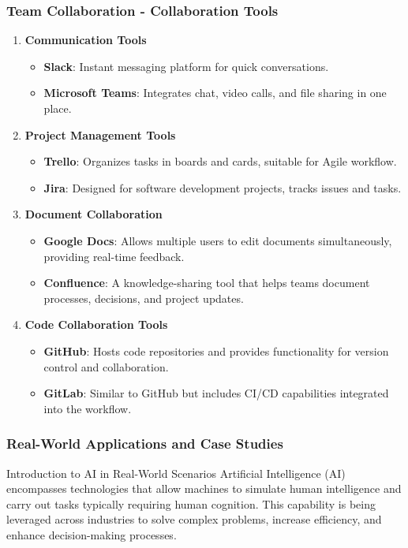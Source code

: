 \documentclass{beamer}
\begin{document}
\begin{frame}[fragile]
    \frametitle{Team Collaboration - Collaboration Tools}
    \begin{enumerate}
        \item \textbf{Communication Tools}
        \begin{itemize}
            \item \textbf{Slack}: Instant messaging platform for quick conversations.
            \item \textbf{Microsoft Teams}: Integrates chat, video calls, and file sharing in one place.
        \end{itemize}
        
        \item \textbf{Project Management Tools}
        \begin{itemize}
            \item \textbf{Trello}: Organizes tasks in boards and cards, suitable for Agile workflow.
            \item \textbf{Jira}: Designed for software development projects, tracks issues and tasks.
        \end{itemize}

        \item \textbf{Document Collaboration}
        \begin{itemize}
            \item \textbf{Google Docs}: Allows multiple users to edit documents simultaneously, providing real-time feedback.
            \item \textbf{Confluence}: A knowledge-sharing tool that helps teams document processes, decisions, and project updates.
        \end{itemize}

        \item \textbf{Code Collaboration Tools}
        \begin{itemize}
            \item \textbf{GitHub}: Hosts code repositories and provides functionality for version control and collaboration.
            \item \textbf{GitLab}: Similar to GitHub but includes CI/CD capabilities integrated into the workflow.
        \end{itemize}
    \end{enumerate}
\end{frame}

\begin{frame}[fragile]
    \frametitle{Real-World Applications and Case Studies}
    \begin{block}{Introduction to AI in Real-World Scenarios}
        Artificial Intelligence (AI) encompasses technologies that allow machines to simulate human intelligence and carry out tasks typically requiring human cognition. This capability is being leveraged across industries to solve complex problems, increase efficiency, and enhance decision-making processes.
    \end{block}
\end{frame}
\end{document}
